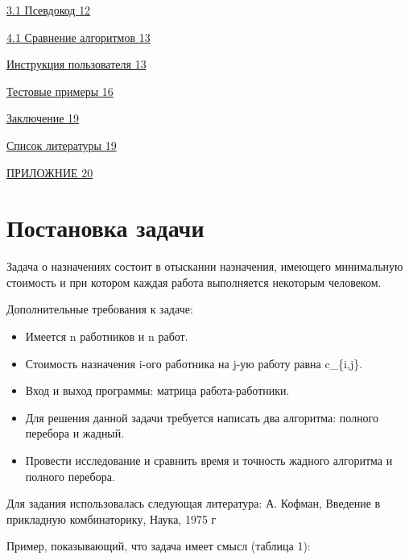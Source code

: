 \documentclass[]{article}
\begin{document}
\protect\hyperlink{Псевдокод}{3.1
Псевдокод
\protect\hyperlink{Псевдокод}{12}}

\protect\hyperlink{Сравнение алгоритмов}{4.1
Сравнение алгоритмов
\protect\hyperlink{Сравнение алгоритмов}{13}}

\protect\hyperlink{Инструкция}{Инструкция
пользователя
\protect\hyperlink{Инструкция}{13}}

\protect\hyperlink{Тестовые примеры}{Тестовые
примеры
\protect\hyperlink{Тестовые примеры}{16}}

\protect\hyperlink{Заключение}{Заключение
\protect\hyperlink{Заключение}{19}}

\protect\hyperlink{Список литературы}{Список
литературы
\protect\hyperlink{Список литературы}{19}}

\protect\hyperlink{Приложение}{ПРИЛОЖНИЕ
\protect\hyperlink{Приложение}{20}}
\newpage
\hypertarget{section}{%
\section{}\label{section}}

\hypertarget{Постановка задачи}{%
\section{Постановка
задачи}\label{Постановка задачи}}

Задача о назначениях состоит в отыскании назначения, имеющего
минимальную стоимость и при котором каждая работа выполняется некоторым
человеком.

Дополнительные требования к задаче:

\begin{itemize}
\item
  Имеется n работников и n работ.
\item
  Стоимость назначения i-ого работника на j-ую работу равна c\_\{i,j\}.
\item
  Вход и выход программы: матрица работа-работники.
\item
  Для решения данной задачи требуется написать два алгоритма: полного
  перебора и жадный.
\item
  Провести исследование и сравнить время и точность жадного алгоритма и
  полного перебора.
\end{itemize}

Для задания использовалась следующая литература: А. Кофман, Введение в
прикладную комбинаторику, Наука, 1975 г

Пример, показывающий, что задача имеет смысл (таблица 1):
\end{document}
